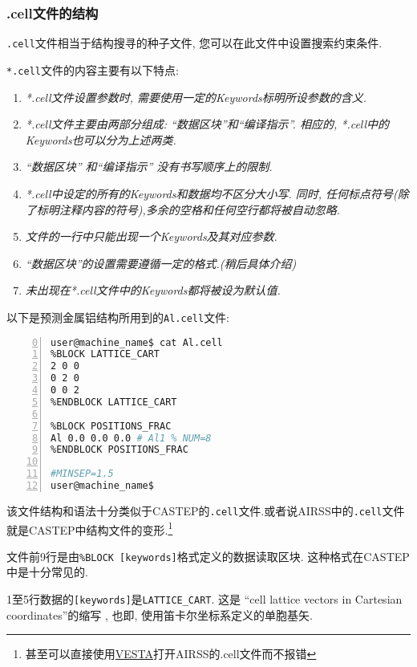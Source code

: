 \documentclass[a4paper, 10pt]{article}
\begin{document}
      \subsubsection{.cell文件的结构}
      \verb|.cell|文件相当于结构搜寻的种子文件, 您可以在此文件中设置搜索约束条件.

      \verb|*.cell|文件的内容主要有以下特点:
          \begin{enumerate}[(1)] 
            \item   \emph{*.cell文件设置参数时, 需要使用一定的Keywords标明所设参数的含义.}
            \item   \emph{*.cell文件主要由两部分组成: ``数据区块''和``编译指示''. 相应的, *.cell中的Keywords也可以分为上述两类.}
            \item   \emph{``数据区块'' 和``编译指示'' 没有书写顺序上的限制.}
            \item   \emph{*.cell中设定的所有的Keywords和数据均不区分大小写. 同时, 任何标点符号(除了标明注释内容的符号),多余的空格和任何空行都将被自动忽略.}
            \item   \emph{文件的一行中只能出现一个Keywords及其对应参数.}
            \item   \emph{``数据区块''的设置需要遵循一定的格式.(稍后具体介绍)}
            \item   \emph{未出现在*.cell文件中的Keywords都将被设为默认值.}
          \end{enumerate}
      
      以下是预测金属铝结构所用到的\verb|Al.cell|文件:
      \begin{lstlisting}[language={bash},numbers=left,firstnumber=0]
user@machine_name$ cat Al.cell
%BLOCK LATTICE_CART
2 0 0
0 2 0
0 0 2 
%ENDBLOCK LATTICE_CART
 
%BLOCK POSITIONS_FRAC
Al 0.0 0.0 0.0 # Al1 % NUM=8
%ENDBLOCK POSITIONS_FRAC

#MINSEP=1.5
user@machine_name$
      \end{lstlisting}

      该文件结构和语法十分类似于CASTEP的\verb|.cell|文件.或者说AIRSS中的\verb|.cell|文件就是CASTEP中结构文件的变形.\footnote{甚至可以直接使用\href{http://jp-minerals.org/vesta/en/}{VESTA}打开AIRSS的.cell文件而不报错} 
 
      文件前9行是由\verb|%BLOCK [keywords]|格式定义的数据读取区块. 这种格式在CASTEP中是十分常见的.  
      
      1至5行数据的\verb|[keywords]|是\verb|LATTICE_CART|. 这是 ``cell lattice vectors in Cartesian coordinates''的缩写 , 也即, 使用笛卡尔坐标系定义的单胞基矢. 
\end{document}
